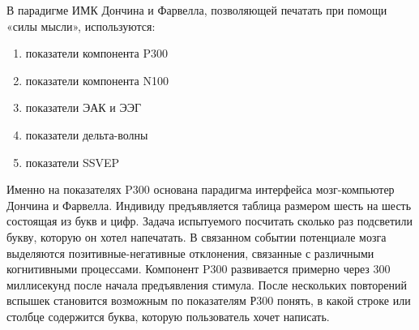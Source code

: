 
В парадигме ИМК Дончина и Фарвелла, позволяющей печатать при помощи «силы мысли», используются:

\begin{enumerate}
    \item показатели компонента P300
    \item показатели компонента N100
    \item показатели ЭАК и ЭЭГ
    \item показатели дельта-волны
    \item показатели SSVEP
\end{enumerate}

\explanationSection

Именно на показателях P300 основана парадигма интерфейса мозг-компьютер Дончина и Фарвелла. Индивиду предъявляется таблица размером шесть на шесть состоящая из букв и цифр. Задача испытуемого посчитать сколько раз подсветили букву, которую он хотел напечатать. В связанном событии потенциале мозга выделяются позитивные-негативные отклонения, связанные с различными когнитивными процессами. Компонент P300 развивается примерно через 300 миллисекунд после начала предъявления стимула. После нескольких повторений вспышек становится возможным по показателям Р300 понять, в какой строке или столбце содержится буква, которую пользователь хочет написать. 

